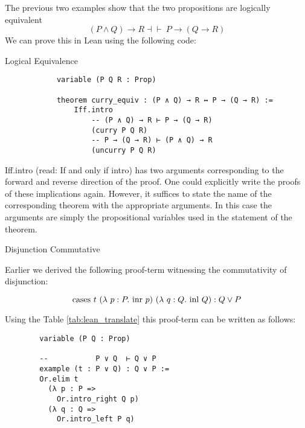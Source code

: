 \documentclass{book}
\begin{document}
    The previous two examples show that the two propositions are logically equivalent $$(P \land Q) \to R \dashv \vdash \ P \to (Q \to R)$$ We can prove this in Lean using the following code: 
    
    \begin{eg}{Logical Equivalence}
        \begin{lstlisting}
            variable (P Q R : Prop)

            theorem curry_equiv : (P ∧ Q) → R ↔ P → (Q → R) :=
                Iff.intro
                    -- (P ∧ Q) → R ⊢ P → (Q → R)
                    (curry P Q R)
                    -- P → (Q → R) ⊢ (P ∧ Q) → R
                    (uncurry P Q R)
        \end{lstlisting}
        Iff.intro (read: If and only if intro) has two arguments corresponding to the forward and reverse direction of the proof. One could explicitly write the proofs of these implications again. However, it suffices to state the name of the corresponding theorem with the appropriate arguments. In this case the arguments are simply the propositional variables used in the statement of the theorem. 
    \end{eg}

    \newpage
    \begin{eg}{Disjunction Commutative}

        Earlier we derived the following proof-term witnessing the commutativity of disjunction:

        $$ \text{cases} \ t \ (\lambda \ p : P. \ \text{inr} \ p) \ (\lambda \ q : Q. \ \text{inl} \ Q) : Q \lor P $$

        Using the Table \ref{tab:lean_translate} this proof-term can be written as follows:

        \begin{lstlisting}
        variable (P Q : Prop)

        --           P ∨ Q  ⊢ Q ∨ P
        example (t : P ∨ Q) : Q ∨ P :=
        Or.elim t
          (λ p : P =>
            Or.intro_right Q p)
          (λ q : Q =>
            Or.intro_left P q)  
        \end{lstlisting}
    \end{eg}
\end{document}
